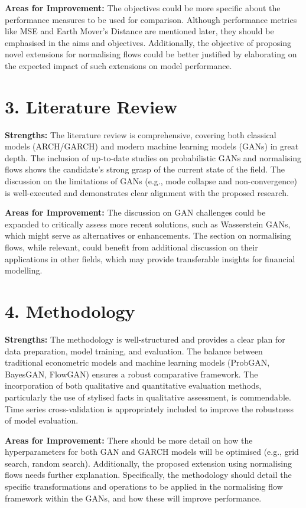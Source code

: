 \documentclass[a4paper,12pt]{article}
\begin{document}
\textbf{Areas for Improvement:}  
The objectives could be more specific about the performance measures to be used for comparison. Although performance metrics like MSE and Earth Mover’s Distance are mentioned later, they should be emphasised in the aims and objectives. Additionally, the objective of proposing novel extensions for normalising flows could be better justified by elaborating on the expected impact of such extensions on model performance.

\section*{3. Literature Review}

\textbf{Strengths:}  
The literature review is comprehensive, covering both classical models (ARCH/GARCH) and modern machine learning models (GANs) in great depth. The inclusion of up-to-date studies on probabilistic GANs and normalising flows shows the candidate's strong grasp of the current state of the field. The discussion on the limitations of GANs (e.g., mode collapse and non-convergence) is well-executed and demonstrates clear alignment with the proposed research.

\textbf{Areas for Improvement:}  
The discussion on GAN challenges could be expanded to critically assess more recent solutions, such as Wasserstein GANs, which might serve as alternatives or enhancements. The section on normalising flows, while relevant, could benefit from additional discussion on their applications in other fields, which may provide transferable insights for financial modelling.

\section*{4. Methodology}

\textbf{Strengths:}  
The methodology is well-structured and provides a clear plan for data preparation, model training, and evaluation. The balance between traditional econometric models and machine learning models (ProbGAN, BayesGAN, FlowGAN) ensures a robust comparative framework. The incorporation of both qualitative and quantitative evaluation methods, particularly the use of stylised facts in qualitative assessment, is commendable. Time series cross-validation is appropriately included to improve the robustness of model evaluation.

\textbf{Areas for Improvement:}  
There should be more detail on how the hyperparameters for both GAN and GARCH models will be optimised (e.g., grid search, random search). Additionally, the proposed extension using normalising flows needs further explanation. Specifically, the methodology should detail the specific transformations and operations to be applied in the normalising flow framework within the GANs, and how these will improve performance.
\end{document}
